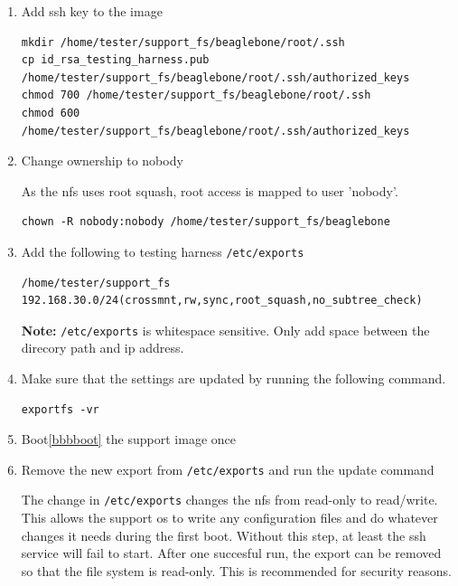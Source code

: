 \documentclass[a4paper,11pt]{article}
\newcommand{\note}{\textbf{Note: }}
\newcommand{\cmd}[1]{\texttt{#1}}
\begin{document}
\begin{enumerate}
\note It may also be necessary to remove connman symlinks from \cmd{etc/rd?.d} folders, where ? is a number.


\item Add ssh key to the image

\begin{lstlisting}
mkdir /home/tester/support_fs/beaglebone/root/.ssh
cp id_rsa_testing_harness.pub /home/tester/support_fs/beaglebone/root/.ssh/authorized_keys
chmod 700 /home/tester/support_fs/beaglebone/root/.ssh
chmod 600 /home/tester/support_fs/beaglebone/root/.ssh/authorized_keys
\end{lstlisting}


\item Change ownership to nobody

As the nfs uses root squash, root access is mapped to user 'nobody'.

\begin{lstlisting}
chown -R nobody:nobody /home/tester/support_fs/beaglebone
\end{lstlisting}



\item Add the following to testing harness \cmd{/etc/exports}

\begin{lstlisting}
/home/tester/support_fs 192.168.30.0/24(crossmnt,rw,sync,root_squash,no_subtree_check) 
\end{lstlisting}

\note \cmd{/etc/exports} is whitespace sensitive. Only add space between the direcory path and ip address.

\item Make sure that the settings are updated by running the following command.

\begin{lstlisting}
exportfs -vr
\end{lstlisting}

\item Boot\ref{bbbboot} the support image once

\item Remove the new export from \cmd{/etc/exports} and run the update command

The change in \cmd{/etc/exports} changes the nfs from read-only to read/write. This allows the support os to write any configuration files and do whatever changes it needs during the first boot. Without this step, at least the ssh service will fail to start. After one succesful run, the export can be removed so that the file system is read-only. This is recommended for security reasons.


\end{enumerate}
\end{document}

